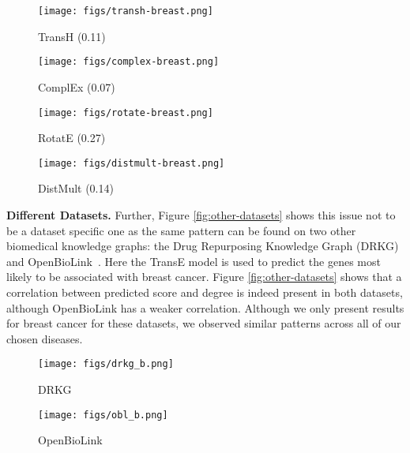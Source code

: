 \begin{figure*}[!h]
	\centering
	\begin{subfigure}[b]{0.24\textwidth}
		\centering
		\texttt{[image: figs/transh-breast.png]}
		\caption{TransH (0.11)}\label{fig:dr:transh}
	\end{subfigure}
	\begin{subfigure}[b]{0.24\textwidth}
		\centering
		\texttt{[image: figs/complex-breast.png]}
		\caption{ComplEx (0.07)}\label{fig:dr:complex}
	\end{subfigure}
	\begin{subfigure}[b]{0.24\textwidth}
		\centering
		\texttt{[image: figs/rotate-breast.png]}
		\caption{RotatE (0.27)}\label{fig:dr:rotate}
	\end{subfigure}
	\begin{subfigure}[b]{0.24\textwidth}
		\centering
		\texttt{[image: figs/distmult-breast.png]}
		\caption{DistMult (0.14)}\label{fig:dr:distmult}
	\end{subfigure}
	\caption{Relationship between gene degree versus predicted score for association with Breast Cancer. Numbers detail the Hits@10 score for that model on a holdout testset. Note that the change scale for the score is due to the different objective function used by the models.}
	\label{fig:degree-regression-models}
\end{figure*}

\textbf{Different Datasets.} Further, Figure \ref{fig:other-datasets} shows this issue not to be a dataset specific one as the same pattern can be found on two other biomedical knowledge graphs: the Drug Repurposing Knowledge Graph (DRKG)~\cite{drkg2020} and OpenBioLink~\cite{breit2020openbiolink}. Here the TransE model is used to predict the genes most likely to be associated with breast cancer. Figure \ref{fig:other-datasets} shows that a correlation between predicted score and degree is indeed present in both datasets, although OpenBioLink has a weaker correlation. Although we only present results for breast cancer for these datasets, we observed similar patterns across all of our chosen diseases.

\begin{figure*}[!h]
	\centering
	\begin{subfigure}[b]{0.32\textwidth}
		\centering
		\texttt{[image: figs/drkg\_b.png]}
		\caption{DRKG}\label{fig:other-datasets:drkg}
	\end{subfigure}
	\begin{subfigure}[b]{0.32\textwidth}
		\centering
		\texttt{[image: figs/obl\_b.png]}
		\caption{OpenBioLink}\label{fig:other-datasets:obl}
	\end{subfigure}
	\caption{Relationship between the predicted score for gene association with breast cancer and degree across other biomedical knowledge graphs.}
	\label{fig:other-datasets}
\end{figure*}

